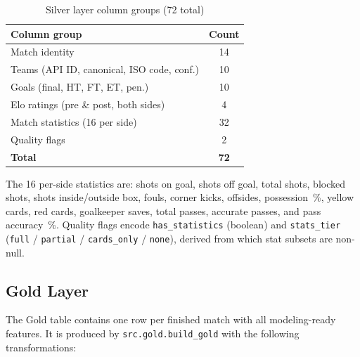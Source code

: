 \documentclass[conference]{IEEEtran}
\begin{document}
\begin{table}[h]
  \centering
  \caption{Silver layer column groups (72 total)}
  \label{tab:silver_schema}
  \begin{tabular}{lc}
    \toprule
    Column group & Count \\
    \midrule
    Match identity                      & 14 \\
    Teams (API ID, canonical, ISO code, conf.) & 10 \\
    Goals (final, HT, FT, ET, pen.)    & 10 \\
    Elo ratings (pre \& post, both sides) & 4 \\
    Match statistics (16 per side)      & 32 \\
    Quality flags                       & 2  \\
    \midrule
    \textbf{Total}                      & \textbf{72} \\
    \bottomrule
  \end{tabular}
\end{table}

The 16 per-side statistics are: shots on goal, shots off goal, total shots,
blocked shots, shots inside/outside box, fouls, corner kicks, offsides,
possession~\%, yellow cards, red cards, goalkeeper saves, total passes,
accurate passes, and pass accuracy~\%.
Quality flags encode \texttt{has\_statistics} (boolean) and
\texttt{stats\_tier} (\texttt{full} / \texttt{partial} / \texttt{cards\_only}
/ \texttt{none}), derived from which stat subsets are non-null.

\subsection{Gold Layer}

The Gold table contains one row per finished match with all modeling-ready features.
It is produced by \texttt{src.gold.build\_gold} with the following transformations:
\end{document}
